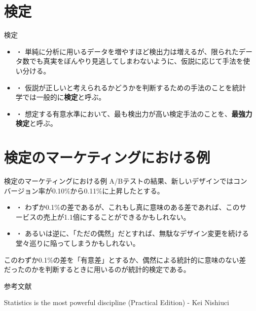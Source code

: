 \documentclass[dvipdfmx, autodetect-engine, aspectratio=169, 10.5pt]{beamer}
\begin{document}
\section{検定}

\begin{frame}{検定}
	\begin{itemize}
		\item ・ 単純に分析に用いるデータを増やすほど検出力は増えるが、限られたデータ数でも真実をぼんやり見逃してしまわないように、仮説に応じて手法を使い分ける。
		      \vspace{5mm}
		\item ・ 仮説が正しいと考えられるかどうかを判断するための手法のことを統計学では一般的に\textbf{検定}と呼ぶ。
		      \vspace{5mm}
		\item ・ 想定する有意水準において、最も検出力が高い検定手法のことを、\textbf{最強力検定}と呼ぶ。
	\end{itemize}
\end{frame}

\section{検定のマーケティングにおける例}

\begin{frame}{検定のマーケティングにおける例}
	A/Bテストの結果、新しいデザインではコンバージョン率が0.10$\%$から0.11$\%$に上昇したとする。
	\vspace{5mm}
	\begin{itemize}
		\item ・ わずか0.1$\%$の差であるが、これもし真に意味のある差であれば、このサービスの売上が1.1倍にすることができるかもしれない。
		\item ・ あるいは逆に、「ただの偶然」だとすれば、無駄なデザイン変更を続ける堂々巡りに陥ってしまうかもしれない。
	\end{itemize}
	\vspace{5mm}
	このわずか0.1$\%$の差を「有意差」とするか、偶然による統計的に意味のない差だったのかを判断するときに用いるのが統計的検定である。
\end{frame}

\begin{frame}[allowframebreaks]{参考文献}
	\begin{thebibliography}{9}
		Statistics is the most powerful discipline (Practical Edition) - Kei Nishiuci
	\end{thebibliography}
\end{frame}
\end{document}
